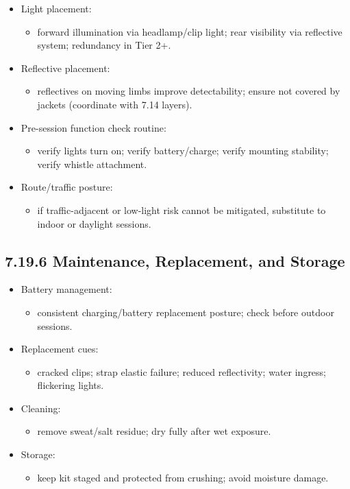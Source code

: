 \documentclass[10pt]{article}
\begin{document}
\begin{itemize}
\item Light placement:
  \begin{itemize}
  \item forward illumination via headlamp/clip light; rear visibility via reflective system; redundancy in Tier 2+.
  \end{itemize}
\item Reflective placement:
  \begin{itemize}
  \item reflectives on moving limbs improve detectability; ensure not covered by jackets (coordinate with 7.14 layers).
  \end{itemize}
\item Pre-session function check routine:
  \begin{itemize}
  \item verify lights turn on; verify battery/charge; verify mounting stability; verify whistle attachment.
  \end{itemize}
\item Route/traffic posture:
  \begin{itemize}
  \item if traffic-adjacent or low-light risk cannot be mitigated, substitute to indoor or daylight sessions.
  \end{itemize}
\end{itemize}

\subsection*{7.19.6 Maintenance, Replacement, and Storage}
{}

\begin{itemize}
\item Battery management:
  \begin{itemize}
  \item consistent charging/battery replacement posture; check before outdoor sessions.
  \end{itemize}
\item Replacement cues:
  \begin{itemize}
  \item cracked clips; strap elastic failure; reduced reflectivity; water ingress; flickering lights.
  \end{itemize}
\item Cleaning:
  \begin{itemize}
  \item remove sweat/salt residue; dry fully after wet exposure.
  \end{itemize}
\item Storage:
  \begin{itemize}
  \item keep kit staged and protected from crushing; avoid moisture damage.
  \end{itemize}
\end{itemize}
\end{document}
